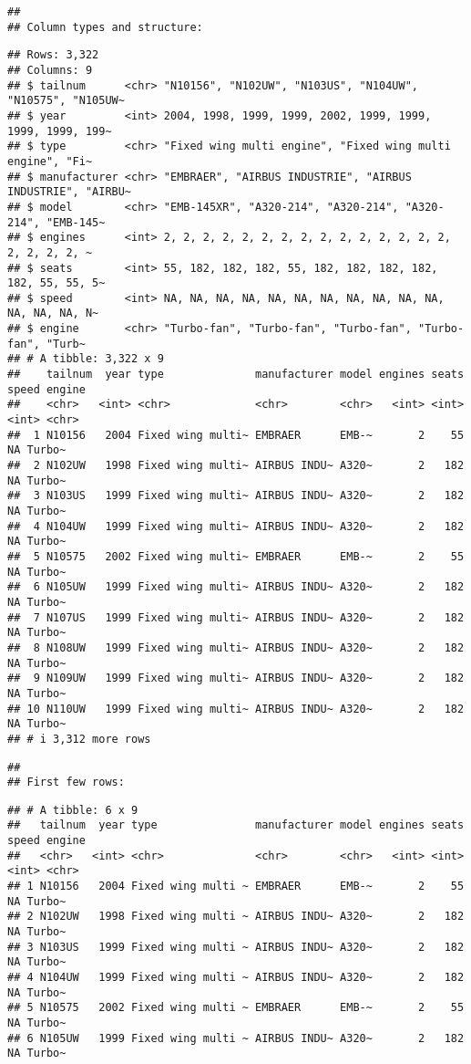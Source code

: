 \documentclass[
]{article}
\begin{document}
\begin{verbatim}
## 
## Column types and structure:
\end{verbatim}

\begin{verbatim}
## Rows: 3,322
## Columns: 9
## $ tailnum      <chr> "N10156", "N102UW", "N103US", "N104UW", "N10575", "N105UW~
## $ year         <int> 2004, 1998, 1999, 1999, 2002, 1999, 1999, 1999, 1999, 199~
## $ type         <chr> "Fixed wing multi engine", "Fixed wing multi engine", "Fi~
## $ manufacturer <chr> "EMBRAER", "AIRBUS INDUSTRIE", "AIRBUS INDUSTRIE", "AIRBU~
## $ model        <chr> "EMB-145XR", "A320-214", "A320-214", "A320-214", "EMB-145~
## $ engines      <int> 2, 2, 2, 2, 2, 2, 2, 2, 2, 2, 2, 2, 2, 2, 2, 2, 2, 2, 2, ~
## $ seats        <int> 55, 182, 182, 182, 55, 182, 182, 182, 182, 182, 55, 55, 5~
## $ speed        <int> NA, NA, NA, NA, NA, NA, NA, NA, NA, NA, NA, NA, NA, NA, N~
## $ engine       <chr> "Turbo-fan", "Turbo-fan", "Turbo-fan", "Turbo-fan", "Turb~
## # A tibble: 3,322 x 9
##    tailnum  year type              manufacturer model engines seats speed engine
##    <chr>   <int> <chr>             <chr>        <chr>   <int> <int> <int> <chr> 
##  1 N10156   2004 Fixed wing multi~ EMBRAER      EMB-~       2    55    NA Turbo~
##  2 N102UW   1998 Fixed wing multi~ AIRBUS INDU~ A320~       2   182    NA Turbo~
##  3 N103US   1999 Fixed wing multi~ AIRBUS INDU~ A320~       2   182    NA Turbo~
##  4 N104UW   1999 Fixed wing multi~ AIRBUS INDU~ A320~       2   182    NA Turbo~
##  5 N10575   2002 Fixed wing multi~ EMBRAER      EMB-~       2    55    NA Turbo~
##  6 N105UW   1999 Fixed wing multi~ AIRBUS INDU~ A320~       2   182    NA Turbo~
##  7 N107US   1999 Fixed wing multi~ AIRBUS INDU~ A320~       2   182    NA Turbo~
##  8 N108UW   1999 Fixed wing multi~ AIRBUS INDU~ A320~       2   182    NA Turbo~
##  9 N109UW   1999 Fixed wing multi~ AIRBUS INDU~ A320~       2   182    NA Turbo~
## 10 N110UW   1999 Fixed wing multi~ AIRBUS INDU~ A320~       2   182    NA Turbo~
## # i 3,312 more rows
\end{verbatim}

\begin{verbatim}
## 
## First few rows:
\end{verbatim}

\begin{verbatim}
## # A tibble: 6 x 9
##   tailnum  year type               manufacturer model engines seats speed engine
##   <chr>   <int> <chr>              <chr>        <chr>   <int> <int> <int> <chr> 
## 1 N10156   2004 Fixed wing multi ~ EMBRAER      EMB-~       2    55    NA Turbo~
## 2 N102UW   1998 Fixed wing multi ~ AIRBUS INDU~ A320~       2   182    NA Turbo~
## 3 N103US   1999 Fixed wing multi ~ AIRBUS INDU~ A320~       2   182    NA Turbo~
## 4 N104UW   1999 Fixed wing multi ~ AIRBUS INDU~ A320~       2   182    NA Turbo~
## 5 N10575   2002 Fixed wing multi ~ EMBRAER      EMB-~       2    55    NA Turbo~
## 6 N105UW   1999 Fixed wing multi ~ AIRBUS INDU~ A320~       2   182    NA Turbo~
\end{verbatim}
\end{document}
